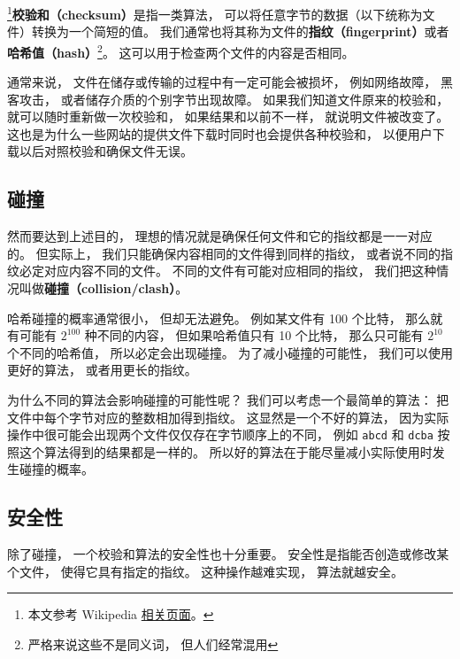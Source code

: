 
\begin{issues}
\end{issues}

\footnote{本文参考 Wikipedia \href{https://en.wikipedia.org/wiki/Checksum}{相关页面}。}\textbf{校验和（checksum）}是指一类算法， 可以将任意字节的数据（以下统称为文件）转换为一个简短的值。 我们通常也将其称为文件的\textbf{指纹（fingerprint）}或者\textbf{哈希值（hash）}\footnote{严格来说这些不是同义词， 但人们经常混用}。 这可以用于检查两个文件的内容是否相同。 %

通常来说， 文件在储存或传输的过程中有一定可能会被损坏， 例如网络故障， 黑客攻击， 或者储存介质的个别字节出现故障。 如果我们知道文件原来的校验和， 就可以随时重新做一次校验和， 如果结果和以前不一样， 就说明文件被改变了。 这也是为什么一些网站的提供文件下载时同时也会提供各种校验和， 以便用户下载以后对照校验和确保文件无误。

\subsection{碰撞}
然而要达到上述目的， 理想的情况就是确保任何文件和它的指纹都是一一对应的。 但实际上， 我们只能确保内容相同的文件得到同样的指纹， 或者说不同的指纹必定对应内容不同的文件。 不同的文件有可能对应相同的指纹， 我们把这种情况叫做\textbf{碰撞（collision/clash）}。

哈希碰撞的概率通常很小， 但却无法避免。 例如某文件有 100 个比特， 那么就有可能有 $2^{100}$ 种不同的内容， 但如果哈希值只有 10 个比特， 那么只可能有 $2^{10}$ 个不同的哈希值， 所以必定会出现碰撞。 为了减小碰撞的可能性， 我们可以使用更好的算法， 或者用更长的指纹。

为什么不同的算法会影响碰撞的可能性呢？ 我们可以考虑一个最简单的算法： 把文件中每个字节对应的整数相加得到指纹。 这显然是一个不好的算法， 因为实际操作中很可能会出现两个文件仅仅存在字节顺序上的不同， 例如 \verb|abcd| 和 \verb|dcba| 按照这个算法得到的结果都是一样的。 所以好的算法在于能尽量减小实际使用时发生碰撞的概率。

\subsection{安全性}
除了碰撞， 一个校验和算法的安全性也十分重要。 安全性是指能否创造或修改某个文件， 使得它具有指定的指纹。 这种操作越难实现， 算法就越安全。

